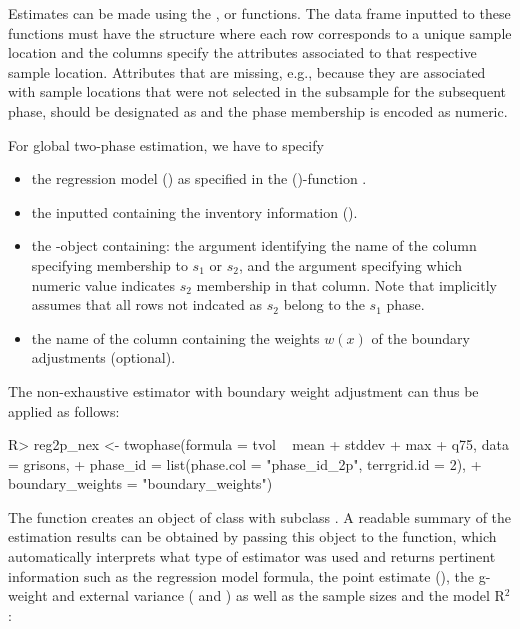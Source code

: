 \documentclass[article]{jss}
\begin{document}
Estimates can be made using the ,  or  functions. The data frame inputted to these functions must have the structure where each row corresponds to a unique sample location and the columns specify the attributes associated to that respective sample location. Attributes that are missing, e.g., because they are associated with sample locations that were not selected in the subsample for the subsequent phase, should be designated as  and the phase membership is encoded as numeric.

For global two-phase estimation, we have to specify

\begin{itemize}
  \itemsep0em
  \item the regression model () as specified in the ()-function \citep{R}.
  \item the inputted  containing the inventory information ().
  \item the -object  containing: the  argument identifying the name of the column specifying membership to $s_1$ or $s_2$, and the  argument specifying which numeric value indicates $s_2$ membership in that column. Note that  implicitly assumes that all rows not indcated as $s_2$ belong to the $s_1$ phase.
  \item the name of the column containing the weights $w(x)$ of the boundary adjustments (optional).
\end{itemize}

The non-exhaustive estimator with boundary weight adjustment can thus be applied as follows:


\begin{Schunk}
\begin{Sinput}
R> reg2p_nex <- twophase(formula = tvol ~ mean + stddev + max + q75, data = grisons, 
+    phase_id = list(phase.col = "phase_id_2p", terrgrid.id = 2),
+    boundary_weights = "boundary_weights")
\end{Sinput}
\end{Schunk}


The  function creates an  object of class  with subclass . A readable summary of the estimation results can be obtained by passing this object to the  function, which automatically interprets what type of estimator was used and returns pertinent information such as the regression model formula, the point estimate (), the g-weight and external variance ( and ) as well as the sample sizes and the model R$^2$:
\end{document}
